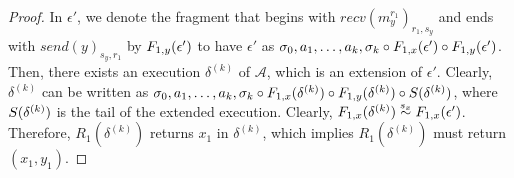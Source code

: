 \begin{proof}
              In $\epsilon'$, we denote the fragment that begins with $recv(m_y^{r_1})_{r_1, s_y}$ and ends with 
              $send(y)_{s_y, r_1}$ by $\frag{1,y}{\epsilon'}$ to have $\epsilon'$ as  
              $\finiteprefix{k-1}{k } \circ \frag{1,x}{\epsilon'}  \circ 
        \frag{1,y}{\epsilon'}$. 
        Then, there exists 
        an execution $\delta^{(k)}$ of $\mathcal{A}$, which is an extension of $\epsilon'$. Clearly, $\delta^{(k)}$ can be written as 
     $\finiteprefix{k-1}{k }  \circ \frag{1,x}{\delta^{(k)}} \circ \frag{1,y}{\delta^{(k)}} \circ \suffix{\delta^{(k)}}$, where $\suffix{\delta^{(k)}}$ is the tail of the extended execution.  Clearly,  $\frag{1,x}{\delta^{(k)}} \stackrel{s_x}{\sim} \frag{1,x}{\epsilon'}$. Therefore,  $R_1(\delta^{(k)})$ returns $x_1$ in $\delta^{(k)}$, which implies $R_1(\delta^{(k)})$ must return $(x_1, y_1)$.    
\end{proof}

